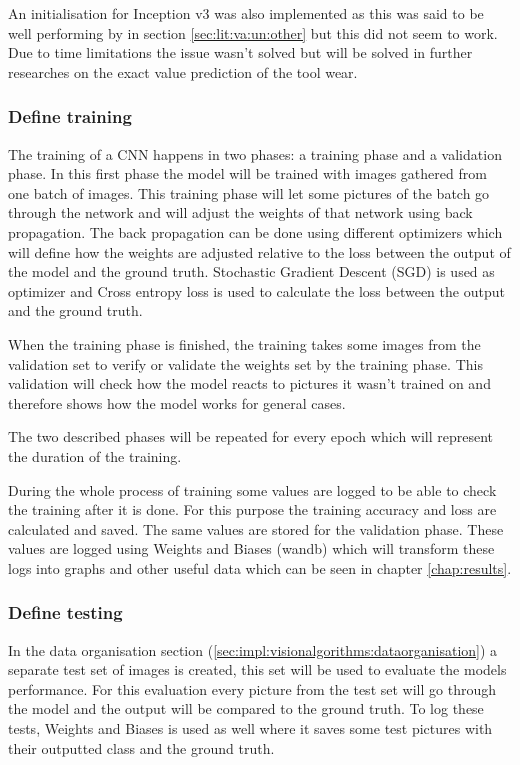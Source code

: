 			An initialisation for Inception v3 was also implemented as this was said to be well performing by \cite{Xu2019} in section \ref{sec:lit:va:un:other} but this did not seem to work. Due to time limitations the issue wasn't solved but will be solved in further researches on the exact value prediction of the tool wear.
			
		\subsubsection{Define training}
			The training of a CNN happens in two phases: a training phase and a validation phase. In this first phase the model will be trained with images gathered from one batch of images. This training phase will let some pictures of the batch go through the network and will adjust the weights of that network using back propagation. The back propagation can be done using different optimizers which will define how the weights are adjusted relative to the loss between the output of the model and the ground truth. Stochastic Gradient Descent (SGD) is used as optimizer and Cross entropy loss is used to calculate the loss between the output and the ground truth.
			
			When the training phase is finished, the training takes some images from the validation set to verify or validate the weights set by the training phase. This validation will check how the model reacts to pictures it wasn't trained on and therefore shows how the model works for general cases.
			
			The two described phases will be repeated for every epoch which will represent the duration of the training.
			
			During the whole process of training some values are logged to be able to check the training after it is done. For this purpose the training accuracy and loss are calculated and saved. The same values are stored for the validation phase. These values are logged using Weights and Biases (wandb) \citep{wandb} which will transform these logs into graphs and other useful data which can be seen in chapter \ref{chap:results}.
			
		\subsubsection{Define testing}
			In the data organisation section (\ref{sec:impl:visionalgorithms:dataorganisation}) a separate test set of images is created, this set will be used to evaluate the models performance. For this evaluation every picture from the test set will go through the model and the output will be compared to the ground truth. To log these tests, Weights and Biases is used as well where it saves some test pictures with their outputted class and the ground truth.
			

